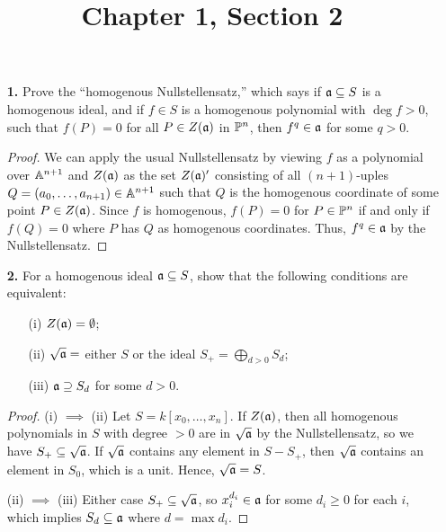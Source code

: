 \documentclass{article}
\title{Chapter 1, Section 2}
\begin{document}
\maketitle
\begin{enumerate} [label=\textbf{\arabic*.}, leftmargin=0cm]

\item[\textbf{1.}] Prove the ``homogenous Nullstellensatz,'' which says if $\mathfrak{a} \subseteq S$ is a homogenous ideal, and if $f \in S$ is a homogenous polynomial with $\deg{f} > 0$, such that $f(P) = 0$ for all $P \in Z(\mathfrak{a})$ in $\mathbb{P}^n$, then $f^q \in \mathfrak{a}$ for some $q > 0$.

\begin{proof}
    We can apply the usual Nullstellensatz by viewing $f$ as a polynomial over $\mathbb{A}^{n + 1}$ and $Z(\mathfrak{a})$ as the set $Z(\mathfrak{a})'$ consisting of all $(n + 1)$-uples $Q = (a_0, \dots, a_{n + 1}) \in \mathbb{A}^{n + 1}$ such that $Q$ is the homogenous coordinate of some point $P \in Z(\mathfrak{a})$.
    Since $f$ is homogenous, $f(P) = 0$ for $P \in \mathbb{P}^n$ if and only if $f(Q) = 0$ where $P$ has $Q$ as homogenous coordinates.
    Thus, $f^q \in \mathfrak{a}$ by the Nullstellensatz.
\end{proof}

\item[\textbf{2.}] For a homogenous ideal $\mathfrak{a} \subseteq S$, show that the following conditions are equivalent:
\begin{itemize}
    \item[(i)] $Z(\mathfrak{a}) = \emptyset$;

    \item[(ii)] $\sqrt{\mathfrak{a}} =$ either $S$ or the ideal $S_+ = \bigoplus_{d > 0} S_d$;

    \item[(iii)] $\mathfrak{a} \supseteq S_d$ for some $d > 0$.
\end{itemize}

\begin{proof}
    (i) $\implies$ (ii) Let $S = k[x_0, \dots, x_n]$.
    If $Z(\goth{a}) \empty$, then all homogenous polynomials in $S$ with degree $> 0$ are in $\sqrt{\mathfrak{a}}$ by the Nullstellensatz, so we have $S_+ \subseteq \sqrt{\mathfrak{a}}$.
    If $\sqrt{\mathfrak{a}}$ contains any element in $S - S_+$, then $\sqrt{\mathfrak{a}}$ contains an element in $S_0$, which is a unit.
    Hence, $\sqrt{\mathfrak{a}} = S$.

    (ii) $\implies$ (iii) Either case $S_+ \subseteq \sqrt{\mathfrak{a}}$, so $x_i^{d_i} \in \mathfrak{a}$ for some $d_i \geq 0$ for each $i$, which implies $S_d \subseteq \mathfrak{a}$ where $d = \max{d_i}$.


\end{proof}
\end{enumerate}
\end{document}
